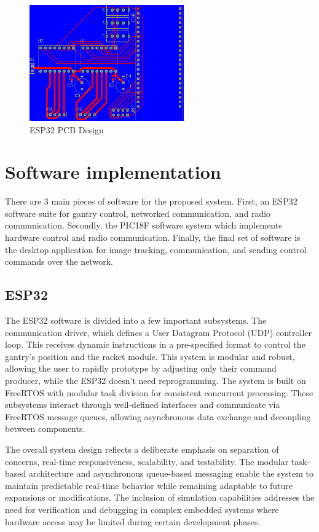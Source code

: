 \begin{figure}[h]
	\centering\includegraphics[height=5cm]{./images/ESP32_pcb}
	\caption{ESP32 PCB Design}
	\label{fig:esp-pcb}
\end{figure}


\section{Software implementation}

There are 3 main pieces of software for the proposed system. First, an ESP32 software suite for gantry control, networked communication, and radio communication. Secondly, the PIC18F software system which implements hardware control and radio communication. Finally, the final set of software is the desktop application for image tracking, communication, and sending control commands over the network.

\subsection{ESP32}
The ESP32 software is divided into a few important subsystems. The communication driver, which defines a User Datagram Protocol (UDP) controller loop. This receives dynamic instructions in a pre-specified format to control the gantry's position and the racket module. This system is modular and robust, allowing the user to rapidly prototype by adjusting only their command producer, while the ESP32 doesn't need reprogramming. The system is built on FreeRTOS with modular task division for consistent concurrent processing. These subsystems interact through well-defined interfaces and communicate via FreeRTOS message queues, allowing asynchronous data exchange and decoupling between components.

The overall system design reflects a deliberate emphasis on separation of concerns, real-time responsiveness, scalability, and testability. The modular task-based architecture and asynchronous queue-based messaging enable the system to maintain predictable real-time behavior while remaining adaptable to future expansions or modifications. The inclusion of simulation capabilities addresses the need for verification and debugging in complex embedded systems where hardware access may be limited during certain development phases.

